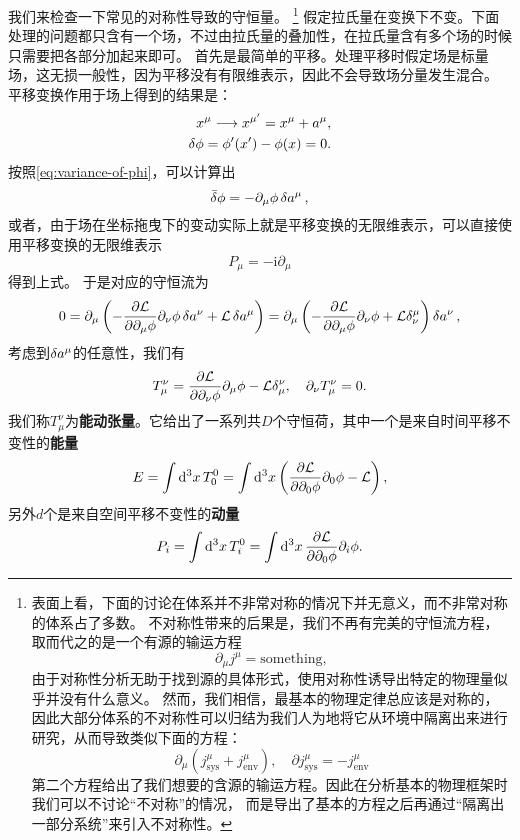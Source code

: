 \documentclass[UTF8, a4paper]{ctexart}
\newcommand*{\ii}{\mathrm{i}}
\begin{document}
我们来检查一下常见的对称性导致的守恒量。%
\footnote{表面上看，下面的讨论在体系并不非常对称的情况下并无意义，而不非常对称的体系占了多数。
不对称性带来的后果是，我们不再有完美的守恒流方程，取而代之的是一个有源的输运方程
\[
    \partial_\mu j^\mu = \text{something},
\]
由于对称性分析无助于找到源的具体形式，使用对称性诱导出特定的物理量似乎并没有什么意义。
然而，我们相信，最基本的物理定律总应该是对称的，因此大部分体系的不对称性可以归结为我们人为地将它从环境中隔离出来进行研究，从而导致类似下面的方程：
\[
    \partial_\mu (j^\mu_\text{sys} + j^\mu_\text{env}), \quad \partial j^\mu_\text{sys} = - j^\mu_\text{env}
\]
第二个方程给出了我们想要的含源的输运方程。因此在分析基本的物理框架时我们可以不讨论“不对称”的情况，
而是导出了基本的方程之后再通过“隔离出一部分系统”来引入不对称性。
}%
假定拉氏量在变换下不变。下面处理的问题都只含有一个场，不过由拉氏量的叠加性，在拉氏量含有多个场的时候只需要把各部分加起来即可。
首先是最简单的平移。处理平移时假定场是标量场，这无损一般性，因为平移没有有限维表示，因此不会导致场分量发生混合。
平移变换作用于场上得到的结果是：
\[
    \begin{split}
        x^\mu \longrightarrow x^{\mu'} = x^\mu + a^\mu, \\
        \var{\phi} = \phi'(x') - \phi(x) = 0.
    \end{split}
\]
按照\eqref{eq:variance-of-phi}，可以计算出
\[
    \bar{\var}{\phi} = - \partial_\mu \phi \var{a^\mu},
\]
或者，由于场在坐标拖曳下的变动实际上就是平移变换的无限维表示，可以直接使用平移变换的无限维表示
\[
    P_\mu = - \ii \partial_\mu
\]
得到上式。
于是对应的守恒流为
\[
    0 = \partial_\mu \left( - \pdv{\mathcal{L}}{\partial_\mu \phi} \partial_\nu \phi \var{a^\nu} + \mathcal{L} \var{a^\mu} \right) 
    = \partial_\mu \left( - \pdv{\mathcal{L}}{\partial_\mu \phi} \partial_\nu \phi + \mathcal{L} \delta^\mu_\nu \right) \var{a^\nu},
\]
考虑到$\var{a^\mu}$的任意性，我们有
\begin{equation}
    T_\mu^\nu = \pdv{\mathcal{L}}{\partial_\nu \phi} \partial_\mu \phi - \mathcal{L} \delta^\nu_\mu, \quad \partial_\nu T_\mu^\nu = 0.
\end{equation}
我们称$T^\nu_\mu$为\textbf{能动张量}。它给出了一系列共$D$个守恒荷，其中一个是来自时间平移不变性的\textbf{能量}
\begin{equation}
    E = \int \dd[3]{x} T^0_0 = \int \dd[3]{x} \left( \pdv{\mathcal{L}}{\partial_0 \phi} \partial_0 \phi - \mathcal{L} \right) ,
    \label{eq:field-energy}
\end{equation}
另外$d$个是来自空间平移不变性的\textbf{动量}
\begin{equation}
    P_i = \int \dd[3]{x} T^0_i = \int \dd[3]{x} \pdv{\mathcal{L}}{\partial_0 \phi} \partial_i \phi .
    \label{eq:field-momentum}
\end{equation}
\end{document}
